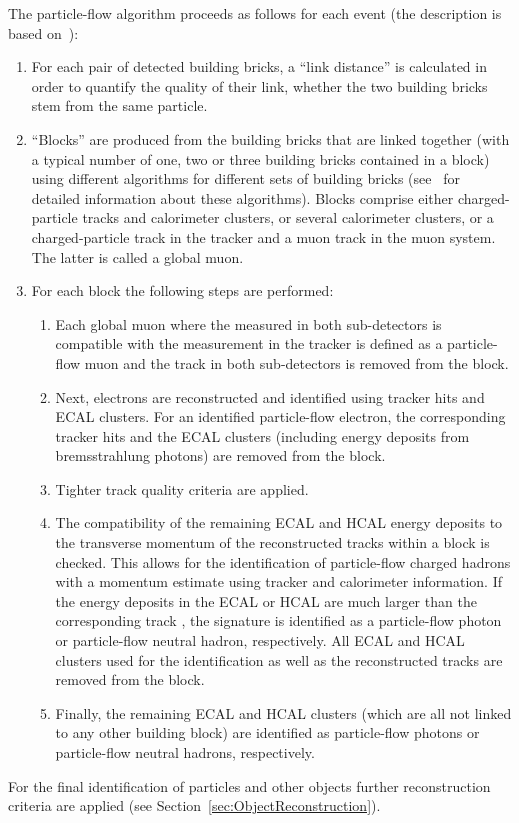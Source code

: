 The particle-flow algorithm proceeds as follows for each event (the description is based on~\cite{CMS-PAS-PFT-09-001}):
\begin{enumerate}
\item For each pair of detected building bricks, a ``link distance'' is calculated in order to quantify the quality of their link, \ie whether the two building bricks stem from the same particle. 
\item ``Blocks'' are produced from the building bricks that are linked together (with a typical number of one, two or three building bricks contained in a block) using different algorithms for different sets of building bricks (see~\cite{CMS-PAS-PFT-09-001} for detailed information about these algorithms).
      Blocks comprise either charged-particle tracks and calorimeter clusters, or several calorimeter clusters, or a charged-particle track in the tracker and a muon track in the muon system.
      The latter is called a global muon.
\item For each block the following steps are performed:
\begin{enumerate}
\item Each global muon where the \pt measured in both sub-detectors is compatible with the  \pt  measurement in the tracker is defined as a particle-flow muon and the track in both sub-detectors is removed from the block.
\item Next, electrons are reconstructed and identified using tracker hits and ECAL clusters. 
      For an identified particle-flow electron, the corresponding tracker hits and the ECAL clusters (including energy deposits from bremsstrahlung photons) are removed from the block. 
\item Tighter track quality criteria are applied.
\item The compatibility of the remaining ECAL and HCAL energy deposits to the transverse momentum of the reconstructed tracks within a block is checked. 
      This allows for the identification of particle-flow charged hadrons with a momentum estimate using tracker and calorimeter information. 
      If the energy deposits in the ECAL or HCAL are much larger than the corresponding track \pt, the signature is identified as a particle-flow photon or particle-flow neutral hadron, respectively. 
      All ECAL and HCAL clusters used for the identification as well as the reconstructed tracks are removed from the block.
\item Finally, the remaining ECAL and HCAL clusters (which are all not linked to any other building block) are identified as particle-flow photons or particle-flow neutral hadrons, respectively.
\end{enumerate}
\end{enumerate}
For the final identification of particles and other objects further reconstruction criteria are applied (see Section~\ref{sec:ObjectReconstruction}).

